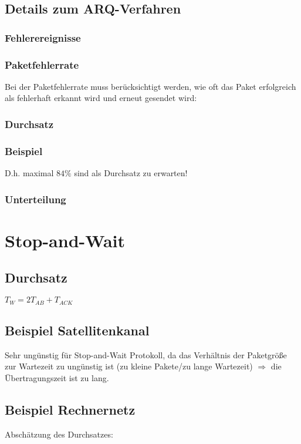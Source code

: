 \subsection{Details zum ARQ-Verfahren}
\subsubsection{Fehlerereignisse}
\subsubsection{Paketfehlerrate}
Bei der Paketfehlerrate muss berücksichtigt werden, wie oft das Paket erfolgreich als fehlerhaft erkannt wird und erneut gesendet wird:
\subsubsection{Durchsatz}
\subsubsection{Beispiel}
D.h. maximal $84\%$ sind als Durchsatz zu erwarten!
\subsubsection{Unterteilung}

\section{Stop-and-Wait}
\subsection{Durchsatz}
$T_W=2T_{AB}+T_{ACK}$
\subsection{Beispiel Satellitenkanal}
Sehr ungünstig für Stop-and-Wait Protokoll, da das Verhältnis der Paketgröße zur Wartezeit zu ungünstig ist (zu kleine Pakete/zu lange Wartezeit) $\Rightarrow$ die Übertragungszeit ist zu lang.
\subsection{Beispiel Rechnernetz}
Abschätzung des Durchsatzes:

